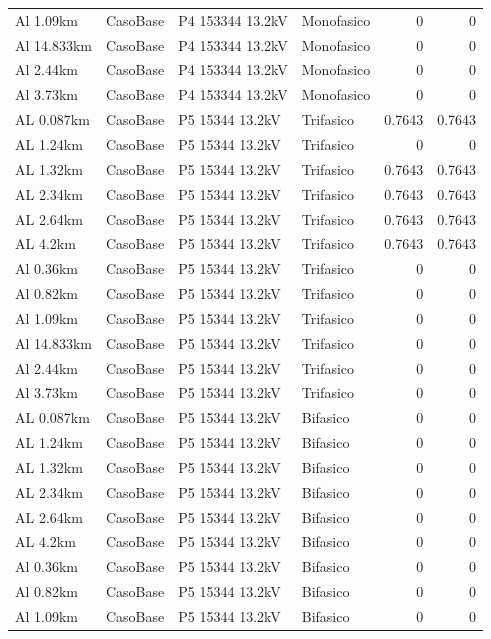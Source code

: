 \documentclass[11pt,a4paper]{article}
\begin{document}
\begin{longtable}{llllrr}
Al 1.09km & CasoBase & P4 153344 13.2kV & Monofasico & 0 & 0 \\
Al 14.833km & CasoBase & P4 153344 13.2kV & Monofasico & 0 & 0 \\
Al 2.44km & CasoBase & P4 153344 13.2kV & Monofasico & 0 & 0 \\
Al 3.73km & CasoBase & P4 153344 13.2kV & Monofasico & 0 & 0 \\
AL 0.087km & CasoBase & P5 15344 13.2kV & Trifasico & 0.7643 & 0.7643 \\
AL 1.24km & CasoBase & P5 15344 13.2kV & Trifasico & 0 & 0 \\
AL 1.32km & CasoBase & P5 15344 13.2kV & Trifasico & 0.7643 & 0.7643 \\
AL 2.34km & CasoBase & P5 15344 13.2kV & Trifasico & 0.7643 & 0.7643 \\
AL 2.64km & CasoBase & P5 15344 13.2kV & Trifasico & 0.7643 & 0.7643 \\
AL 4.2km & CasoBase & P5 15344 13.2kV & Trifasico & 0.7643 & 0.7643 \\
Al 0.36km & CasoBase & P5 15344 13.2kV & Trifasico & 0 & 0 \\
Al 0.82km & CasoBase & P5 15344 13.2kV & Trifasico & 0 & 0 \\
Al 1.09km & CasoBase & P5 15344 13.2kV & Trifasico & 0 & 0 \\
Al 14.833km & CasoBase & P5 15344 13.2kV & Trifasico & 0 & 0 \\
Al 2.44km & CasoBase & P5 15344 13.2kV & Trifasico & 0 & 0 \\
Al 3.73km & CasoBase & P5 15344 13.2kV & Trifasico & 0 & 0 \\
AL 0.087km & CasoBase & P5 15344 13.2kV & Bifasico & 0 & 0 \\
AL 1.24km & CasoBase & P5 15344 13.2kV & Bifasico & 0 & 0 \\
AL 1.32km & CasoBase & P5 15344 13.2kV & Bifasico & 0 & 0 \\
AL 2.34km & CasoBase & P5 15344 13.2kV & Bifasico & 0 & 0 \\
AL 2.64km & CasoBase & P5 15344 13.2kV & Bifasico & 0 & 0 \\
AL 4.2km & CasoBase & P5 15344 13.2kV & Bifasico & 0 & 0 \\
Al 0.36km & CasoBase & P5 15344 13.2kV & Bifasico & 0 & 0 \\
Al 0.82km & CasoBase & P5 15344 13.2kV & Bifasico & 0 & 0 \\
Al 1.09km & CasoBase & P5 15344 13.2kV & Bifasico & 0 & 0 \\

\end{longtable}
\end{document}

